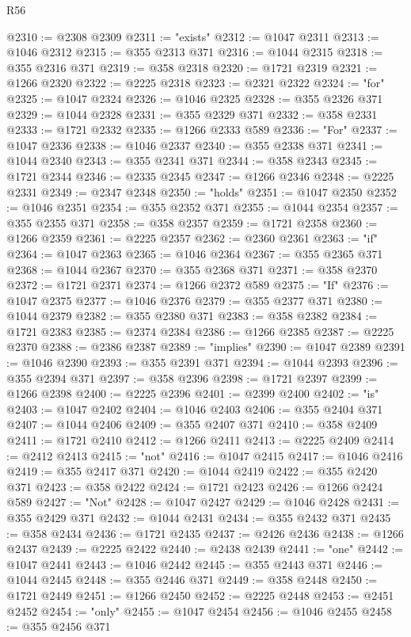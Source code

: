\begin{lexlean}{R56}
\begin{coremodule}
@2310 := @2308 @2309
@2311 := "exists"
@2312 := @1047 @2311
@2313 := @1046 @2312
@2315 := @355 @2313 @371
@2316 := @1044 @2315
@2318 := @355 @2316 @371
@2319 := @358 @2318
@2320 := @1721 @2319
@2321 := @1266 @2320
@2322 := @2225 @2318
@2323 := @2321 @2322
@2324 := "for"
@2325 := @1047 @2324
@2326 := @1046 @2325
@2328 := @355 @2326 @371
@2329 := @1044 @2328
@2331 := @355 @2329 @371
@2332 := @358 @2331
@2333 := @1721 @2332
@2335 := @1266 @2333 @589
@2336 := "For"
@2337 := @1047 @2336
@2338 := @1046 @2337
@2340 := @355 @2338 @371
@2341 := @1044 @2340
@2343 := @355 @2341 @371
@2344 := @358 @2343
@2345 := @1721 @2344
@2346 := @2335 @2345
@2347 := @1266 @2346
@2348 := @2225 @2331
@2349 := @2347 @2348
@2350 := "holds"
@2351 := @1047 @2350
@2352 := @1046 @2351
@2354 := @355 @2352 @371
@2355 := @1044 @2354
@2357 := @355 @2355 @371
@2358 := @358 @2357
@2359 := @1721 @2358
@2360 := @1266 @2359
@2361 := @2225 @2357
@2362 := @2360 @2361
@2363 := "if"
@2364 := @1047 @2363
@2365 := @1046 @2364
@2367 := @355 @2365 @371
@2368 := @1044 @2367
@2370 := @355 @2368 @371
@2371 := @358 @2370
@2372 := @1721 @2371
@2374 := @1266 @2372 @589
@2375 := "If"
@2376 := @1047 @2375
@2377 := @1046 @2376
@2379 := @355 @2377 @371
@2380 := @1044 @2379
@2382 := @355 @2380 @371
@2383 := @358 @2382
@2384 := @1721 @2383
@2385 := @2374 @2384
@2386 := @1266 @2385
@2387 := @2225 @2370
@2388 := @2386 @2387
@2389 := "implies"
@2390 := @1047 @2389
@2391 := @1046 @2390
@2393 := @355 @2391 @371
@2394 := @1044 @2393
@2396 := @355 @2394 @371
@2397 := @358 @2396
@2398 := @1721 @2397
@2399 := @1266 @2398
@2400 := @2225 @2396
@2401 := @2399 @2400
@2402 := "is"
@2403 := @1047 @2402
@2404 := @1046 @2403
@2406 := @355 @2404 @371
@2407 := @1044 @2406
@2409 := @355 @2407 @371
@2410 := @358 @2409
@2411 := @1721 @2410
@2412 := @1266 @2411
@2413 := @2225 @2409
@2414 := @2412 @2413
@2415 := "not"
@2416 := @1047 @2415
@2417 := @1046 @2416
@2419 := @355 @2417 @371
@2420 := @1044 @2419
@2422 := @355 @2420 @371
@2423 := @358 @2422
@2424 := @1721 @2423
@2426 := @1266 @2424 @589
@2427 := "Not"
@2428 := @1047 @2427
@2429 := @1046 @2428
@2431 := @355 @2429 @371
@2432 := @1044 @2431
@2434 := @355 @2432 @371
@2435 := @358 @2434
@2436 := @1721 @2435
@2437 := @2426 @2436
@2438 := @1266 @2437
@2439 := @2225 @2422
@2440 := @2438 @2439
@2441 := "one"
@2442 := @1047 @2441
@2443 := @1046 @2442
@2445 := @355 @2443 @371
@2446 := @1044 @2445
@2448 := @355 @2446 @371
@2449 := @358 @2448
@2450 := @1721 @2449
@2451 := @1266 @2450
@2452 := @2225 @2448
@2453 := @2451 @2452
@2454 := "only"
@2455 := @1047 @2454
@2456 := @1046 @2455
@2458 := @355 @2456 @371

\end{coremodule}
\end{lexlean}
